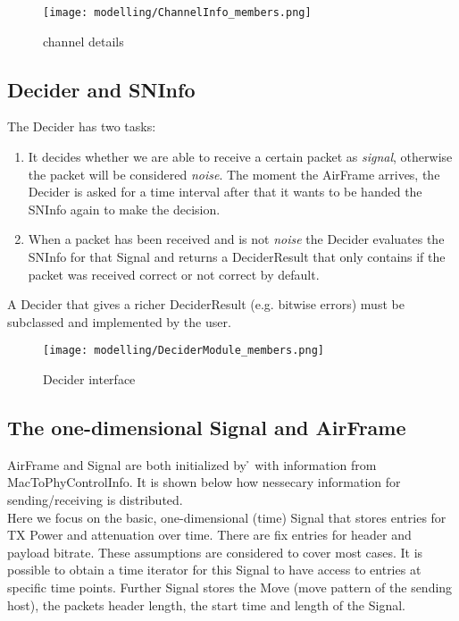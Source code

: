 \begin{figure}[H]
 \centering
 \texttt{[image: modelling/ChannelInfo\_members.png]}
 \caption{channel details}
 \label{fig: channel details}
\end{figure}




\subsection{Decider and SNInfo}
\label{decider}

The Decider has two tasks:
\begin{enumerate}
	\item It decides whether we are able to receive a certain packet as
\textit{signal}, otherwise the packet will be considered
\textit{noise}. The moment the AirFrame arrives, the Decider is
asked for a time interval after that it wants to be handed the SNInfo again to
make the decision.
	\item When a packet has been received and is not \textit{noise} the
Decider evaluates the SNInfo for that Signal and returns a DeciderResult that
only contains if the packet was received correct or not correct by
default.
\end{enumerate}

A Decider that gives a richer DeciderResult (e.g. bitwise
errors) must be subclassed and implemented by the user.

\begin{figure}[H]
 \centering
 \texttt{[image: modelling/DeciderModule\_members.png]}
 \caption{Decider interface}
 \label{fig: Decider interface}
\end{figure}


\subsection{The one-dimensional Signal and AirFrame}
\label{AirFrame and Signal}

AirFrame and Signal are both initialized by \h{\bp} with information from
MacToPhyControlInfo.
It is shown below how nessecary information for sending/receiving is
distributed.\\

Here we focus on the basic, one-dimensional (time) Signal that stores entries
for TX Power and attenuation over time. There are fix entries for header and
payload bitrate. These assumptions are considered to cover most cases.
It is possible to obtain a time iterator for this Signal to have access to
entries at specific time points.
Further Signal stores the Move (move pattern of the sending host), the packets
header length, the start time and length of the Signal.\\

